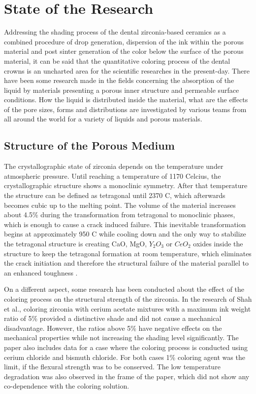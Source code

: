 \chapter{State of the Research}
\label{sec:stand_forschung}

Addressing the shading process of the dental zirconia-based ceramics as a combined procedure of drop generation, dispersion of the ink within the porous material and post sinter generation of the color below the surface of the porous material, it can be said that the quantitative coloring process of the dental crowns is an uncharted area for the scientific researches in the present-day. There have been some research made in the fields concerning the absorption of the liquid by materials presenting a porous inner structure and permeable surface conditions. How the liquid is distributed inside the material, what are the effects of the pore sizes, forms and distributions are investigated by various teams from all around the world for a variety of liquids and porous materials. 



\section{Structure of the Porous Medium}

The crystallographic state of zirconia depends on the temperature under atmospheric pressure. Until reaching a temperature of {1170\textdegree} Celcius, the crystallographic structure shows a monoclinic symmetry. After that temperature the structure can be defined as tetragonal until {2370\textdegree} C, which afterwards becomes cubic up to the melting point. The volume of the material increases about 4.5\% during the transformation from tetragonal to monoclinic phases, which is enough to cause a crack induced failure. This inevitable transformation begins at approximately {950\textdegree} C while cooling down and the only way to stabilize the tetragonal structure is creating CaO, MgO, $Y_{2}O_{3}$ or $CeO_{2}$ oxides inside the structure to keep the tetragonal formation  at room temperature, which eliminates the crack initiation and therefore the structural failure of the material parallel to an enhanced toughness \citep{denry2008state}.

On a different aspect, some research has been conducted about the effect of the coloring process on the structural strength of the zirconia. In the research of Shah et al., coloring zirconia with cerium acetate mixtures with a maximum ink weight ratio of 5\% provided a distinctive shade and did not cause a mechanical disadvantage. However, the ratios above 5\% have negative effects on the mechanical properties while not increasing the shading level significantly. The paper also includes data for a case where the coloring process is conducted using cerium chloride and bismuth chloride. For both cases 1\% coloring agent was the limit, if the flexural strength was to be conserved. The low temperature degradation was also observed in the frame of the paper, which did not show any co-dependence with the coloring solution\citep{shah2008effect}.

